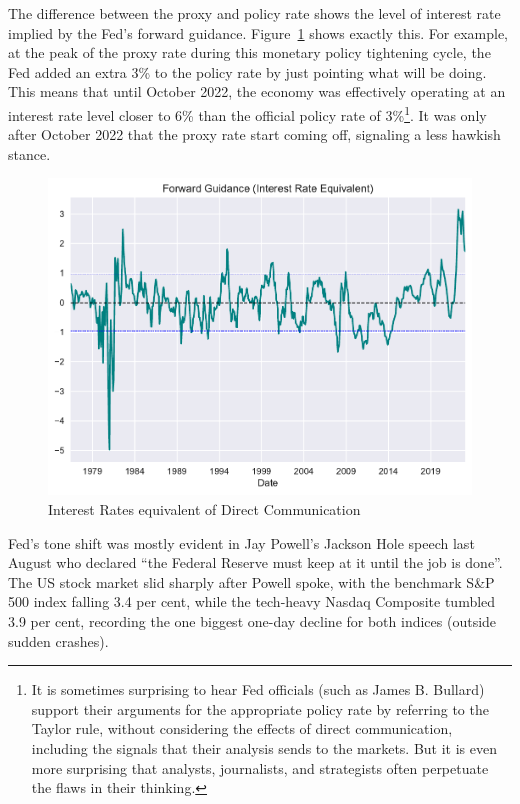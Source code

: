 \documentclass[
  letterpaper,
  DIV=11,
  numbers=noendperiod]{scrartcl}
\begin{document}
The difference between the proxy and policy rate shows the level of
interest rate implied by the Fed's forward guidance. Figure~\ref{fig-2}
shows exactly this. For example, at the peak of the proxy rate during
this monetary policy tightening cycle, the Fed added an extra 3\% to the
policy rate by just pointing what will be doing. This means that until
October 2022, the economy was effectively operating at an interest rate
level closer to 6\% than the official policy rate of 3\%\footnote{It is
  sometimes surprising to hear Fed officials (such as James B. Bullard)
  support their arguments for the appropriate policy rate by referring
  to the Taylor rule, without considering the effects of direct
  communication, including the signals that their analysis sends to the
  markets. But it is even more surprising that analysts, journalists,
  and strategists often perpetuate the flaws in their thinking.}. It was
only after October 2022 that the proxy rate start coming off, signaling
a less hawkish stance.

\begin{figure}

{\centering \includegraphics{Hawkish_Fed_files/figure-pdf/fig-2-output-1.pdf}

}

\caption{\label{fig-2}Interest Rates equivalent of Direct Communication}

\end{figure}

Fed's tone shift was mostly evident in Jay Powell's Jackson Hole speech
last August who declared ``the Federal Reserve must keep at it until the
job is done''. The US stock market slid sharply after Powell spoke, with
the benchmark S\&P 500 index falling 3.4 per cent, while the tech-heavy
Nasdaq Composite tumbled 3.9 per cent, recording the one biggest one-day
decline for both indices (outside sudden crashes).
\end{document}
